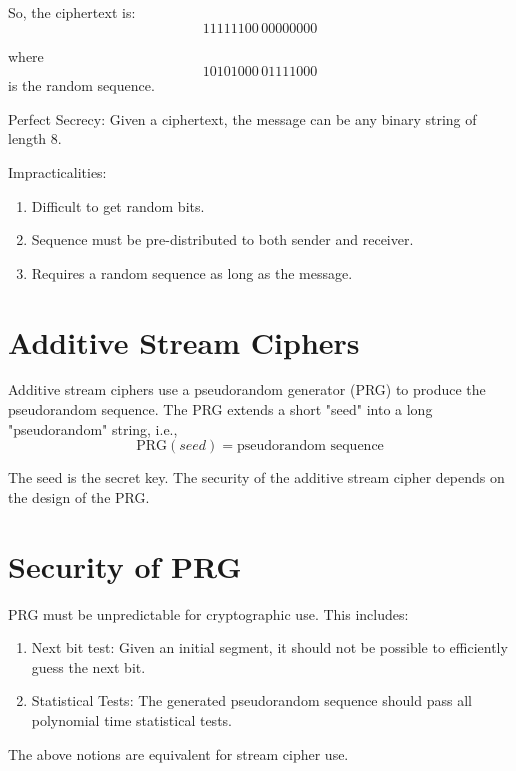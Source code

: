 \documentclass[11pt]{article}
\begin{document}
So, the ciphertext is:
\[ 11111100 \, 00000000 \]

where
\[ 10101000 \, 01111000 \]
is the random sequence.

Perfect Secrecy:
Given a ciphertext, the message can be any binary string of length 8.

Impracticalities:
\begin{enumerate}
    \item Difficult to get random bits.
    \item Sequence must be pre-distributed to both sender and receiver.
    \item Requires a random sequence as long as the message.
\end{enumerate}

\section*{Additive Stream Ciphers}

Additive stream ciphers use a pseudorandom generator (PRG) to produce the pseudorandom sequence. The PRG extends a short "seed" into a long "pseudorandom" string, i.e.,
\[ \text{PRG}(seed) = \text{pseudorandom sequence} \]

The seed is the secret key. The security of the additive stream cipher depends on the design of the PRG.

\section*{Security of PRG}

PRG must be unpredictable for cryptographic use. This includes:
\begin{enumerate}
    \item Next bit test: Given an initial segment, it should not be possible to efficiently guess the next bit.
    \item Statistical Tests: The generated pseudorandom sequence should pass all polynomial time statistical tests.
\end{enumerate}

The above notions are equivalent for stream cipher use.
\end{document}
